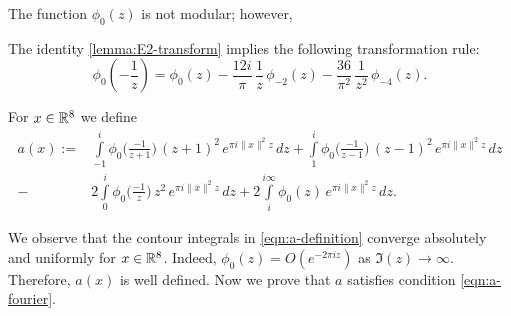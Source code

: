 The function $\phi_0(z)$ is not modular; however,

\begin{lemma}\label{lemma: phi0 transform}
    The identity \ref{lemma:E2-transform} implies the following transformation rule:
\begin{equation}\label{eqn: phi0 transform}
    \phi_0\left(-\frac{1}{z}\right) = \phi_0(z)-\frac{12i}{\pi}\,\frac{1}{z}\,\phi_{-2}(z)-\frac{36}{\pi^2}\,\frac{1}{z^2}\,\phi_{-4}(z).
\end{equation}
\end{lemma}

\begin{definition}\label{def:a-definition}
For $x\in\mathbb{R}^8$ we define
\begin{align}\label{eqn:a-definition}
    a(x):=&\int\limits_{-1}^i\phi_0\Big(\frac{-1}{z+1}\Big)\,(z+1)^2\,e^{\pi i \|x\|^2 z}\,dz
    +\int\limits_{1}^i\phi_0\Big(\frac{-1}{z-1}\Big)\,(z-1)^2\,e^{\pi i \|x\|^2 z}\,dz\\
    -&2\int\limits_{0}^i\phi_0\Big(\frac{-1}{z}\Big)\,z^2\,e^{\pi i \|x\|^2 z}\,dz
    +2\int\limits_{i}^{i\infty}\phi_0(z)\,e^{\pi i \|x\|^2 z}\,dz.\nonumber
\end{align}
\end{definition}

We observe that the contour integrals in \eqref{eqn:a-definition} converge absolutely and uniformly for    $x\in\mathbb{R}^8$. Indeed,
$\phi_0(z)=O(e^{-2\pi i z})$ as $\Im(z)\to \infty$. Therefore, $a(x)$ is well defined. Now we prove that $a$ satisfies condition \eqref{eqn:a-fourier}.

